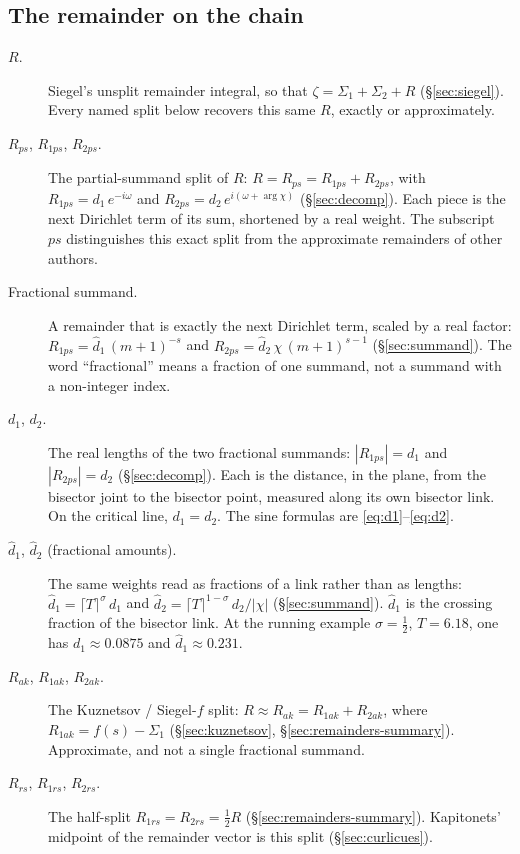 \documentclass[11pt]{article}
\theoremstyle{definition}
\begin{document}
\subsection*{The remainder on the chain}

\begin{description}
\item[$R$.]
Siegel's unsplit remainder integral, so that
$\zeta=\Sigma_1+\Sigma_2+R$ (\S\ref{sec:siegel}).
Every named split below recovers this same $R$, exactly or
approximately.

\item[$R_{ps}$, $R_{1ps}$, $R_{2ps}$.]
The partial-summand split of $R$:
$R=R_{ps}=R_{1ps}+R_{2ps}$, with
$R_{1ps}=d_1\,e^{-i\omega}$ and
$R_{2ps}=d_2\,e^{i(\omega+\arg\chi)}$
(\S\ref{sec:decomp}).
Each piece is the next Dirichlet term of its sum, shortened by a
real weight.
The subscript $ps$ distinguishes this exact split from the
approximate remainders of other authors.

\item[Fractional summand.]
A remainder that is exactly the next Dirichlet term, scaled by a
real factor: $R_{1ps}=\hat d_1\,(m+1)^{-s}$ and
$R_{2ps}=\hat d_2\,\chi\,(m+1)^{s-1}$
(\S\ref{sec:summand}).
The word ``fractional'' means a fraction of one summand, not a
summand with a non-integer index.

\item[$d_1$, $d_2$.]
The real lengths of the two fractional summands:
$|R_{1ps}|=d_1$ and $|R_{2ps}|=d_2$
(\S\ref{sec:decomp}).
Each is the distance, in the plane, from the bisector joint to the
bisector point, measured along its own bisector link.
On the critical line, $d_1=d_2$.
The sine formulas are \eqref{eq:d1}--\eqref{eq:d2}.

\item[$\hat d_1$, $\hat d_2$ (fractional amounts).]
The same weights read as fractions of a link rather than as
lengths:
$\hat d_1=\lceil T\rceil^{\sigma}\,d_1$ and
$\hat d_2=\lceil T\rceil^{1-\sigma}\,d_2/|\chi|$
(\S\ref{sec:summand}).
$\hat d_1$ is the crossing fraction of the bisector link.
At the running example $\sigma=\tfrac12$, $T=6.18$, one has
$d_1\approx0.0875$ and $\hat d_1\approx0.231$.

\item[$R_{ak}$, $R_{1ak}$, $R_{2ak}$.]
The Kuznetsov / Siegel-$f$ split:
$R\approx R_{ak}=R_{1ak}+R_{2ak}$, where
$R_{1ak}=f(s)-\Sigma_1$
(\S\ref{sec:kuznetsov}, \S\ref{sec:remainders-summary}).
Approximate, and not a single fractional summand.

\item[$R_{rs}$, $R_{1rs}$, $R_{2rs}$.]
The half-split $R_{1rs}=R_{2rs}=\tfrac12 R$
(\S\ref{sec:remainders-summary}).
Kapitonets' midpoint of the remainder vector is this split
(\S\ref{sec:curlicues}).
\end{description}
\end{document}
